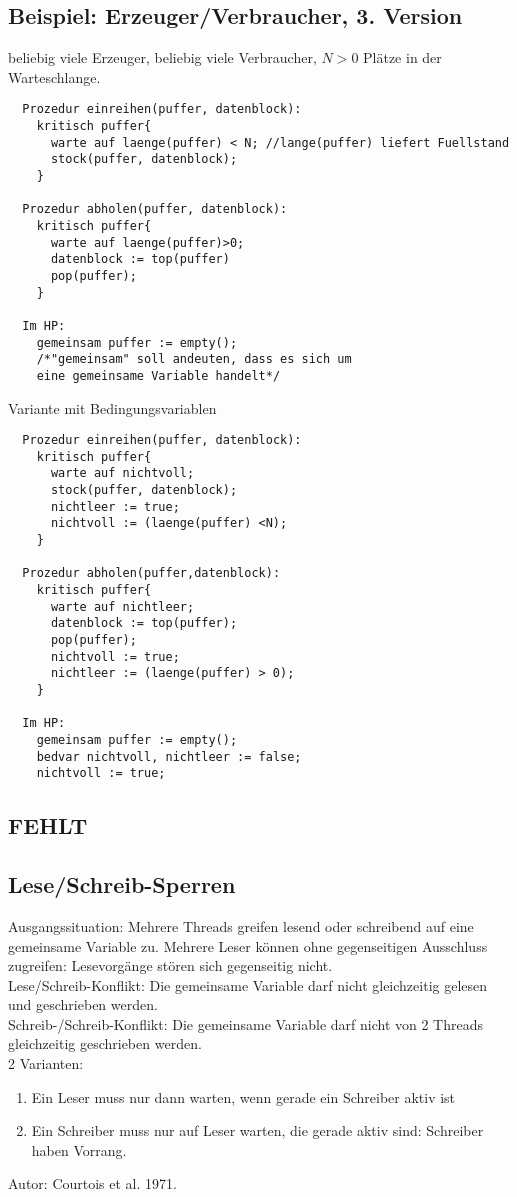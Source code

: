 \documentclass[a4paper,12pt]{scrartcl}
\begin{document}
 \subsection{Beispiel: Erzeuger/Verbraucher, 3. Version}

 beliebig viele Erzeuger, beliebig viele Verbraucher, $N>0$ Plätze in der Warteschlange.
 \begin{lstlisting}
  Prozedur einreihen(puffer, datenblock):
    kritisch puffer{
      warte auf laenge(puffer) < N; //lange(puffer) liefert Fuellstand
      stock(puffer, datenblock);
    }
    
  Prozedur abholen(puffer, datenblock):
    kritisch puffer{
      warte auf laenge(puffer)>0;
      datenblock := top(puffer)
      pop(puffer);
    }
 
  Im HP:
    gemeinsam puffer := empty(); 
    /*"gemeinsam" soll andeuten, dass es sich um 
    eine gemeinsame Variable handelt*/
 \end{lstlisting}
Variante mit Bedingungsvariablen
\begin{lstlisting}
  Prozedur einreihen(puffer, datenblock):
    kritisch puffer{
      warte auf nichtvoll;
      stock(puffer, datenblock);
      nichtleer := true;
      nichtvoll := (laenge(puffer) <N);
    }
  
  Prozedur abholen(puffer,datenblock):
    kritisch puffer{
      warte auf nichtleer;
      datenblock := top(puffer);
      pop(puffer);
      nichtvoll := true;
      nichtleer := (laenge(puffer) > 0);
    }
  
  Im HP:
    gemeinsam puffer := empty();
    bedvar nichtvoll, nichtleer := false;
    nichtvoll := true;
\end{lstlisting}

\subsection{FEHLT}

\subsection{Lese/Schreib-Sperren}

Ausgangssituation: Mehrere Threads greifen lesend oder schreibend auf eine gemeinsame Variable zu. Mehrere Leser können ohne gegenseitigen Ausschluss zugreifen: Lesevorgänge stören sich gegenseitig nicht.\\
Lese/Schreib-Konflikt: Die gemeinsame Variable darf nicht gleichzeitig gelesen und geschrieben werden.\\
Schreib-/Schreib-Konflikt:
Die gemeinsame Variable darf nicht von 2 Threads gleichzeitig geschrieben werden.\\
2 Varianten:
\begin{enumerate}
 \item Ein Leser muss nur dann warten, wenn gerade ein Schreiber aktiv ist
 \item Ein Schreiber muss nur auf Leser warten, die gerade aktiv sind: Schreiber haben Vorrang.
 \end{enumerate}
Autor: Courtois et al. 1971.
\end{document}
